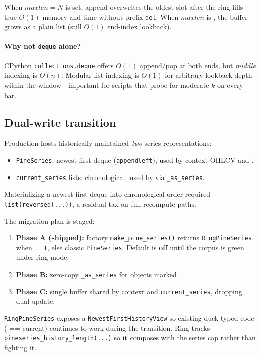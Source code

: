 \documentclass[11pt,a4paper]{article}
\begin{document}
When $\mathit{maxlen}=N$ is set, append overwrites the oldest slot after the
ring fills---true $O(1)$ memory and time without prefix \texttt{del}.  When
$\mathit{maxlen}$ is , the buffer grows as a plain list (still $O(1)$
end-index lookback).

\paragraph{Why not \texttt{deque} alone?}
CPython \texttt{collections.deque} offers $O(1)$ append/pop at both ends, but
\emph{middle} indexing is $O(n)$.  Modular list indexing is $O(1)$ for
arbitrary lookback depth within the window---important for scripts that probe
 for moderate $k$ on every bar.

\subsection{Dual-write transition}

Production hosts historically maintained \emph{two} series representations:
\begin{itemize}[leftmargin=*]
  \item \texttt{PineSeries}: newest-first deque (\texttt{appendleft}), used by
        context OHLCV and .
  \item \texttt{current\_series} lists: chronological, used by \ta{} via
        \texttt{\_as\_series}.
\end{itemize}
Materializing a newest-first deque into chronological order required
\texttt{list(reversed(...))}, a residual tax on full-recompute paths.

The migration plan is staged:
\begin{enumerate}[leftmargin=*]
  \item \textbf{Phase A (shipped):} factory \texttt{make\_pine\_series()}
        returns \texttt{RingPineSeries} when ${}=1$,
        else classic \texttt{PineSeries}.  Default is \textbf{off} until the
        corpus is green under ring mode.
  \item \textbf{Phase B:} zero-copy \texttt{\_as\_series} for objects marked
        .
  \item \textbf{Phase C:} single buffer shared by context and
        \texttt{current\_series}, dropping dual update.
\end{enumerate}

\texttt{RingPineSeries} exposes a \texttt{NewestFirstHistoryView} so existing
duck-typed code ( == current) continues to work during the
transition.  Ring  tracks
\texttt{pineseries\_history\_length(...)} so it composes with the series cap
rather than fighting it.
\end{document}
